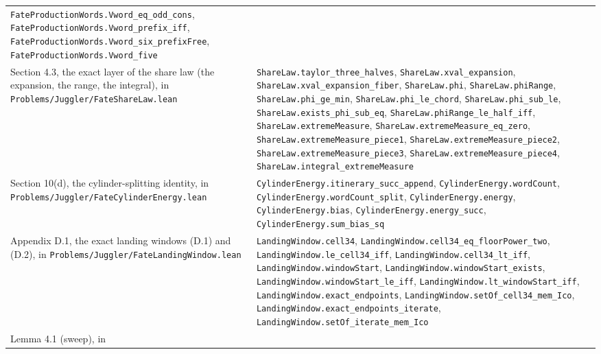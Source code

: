 \documentclass[11pt,a4paper]{article}
\begin{document}
\begin{longtable}[]{@{}
  >{\raggedright\arraybackslash}p{}
  >{\raggedright\arraybackslash}p{}@{}}
\texttt{\nolinkurl{FateProductionWords.Vword_eq_odd_cons}},
\texttt{\nolinkurl{FateProductionWords.Vword_prefix_iff}},
\texttt{\nolinkurl{FateProductionWords.Vword_six_prefixFree}},
\texttt{\nolinkurl{FateProductionWords.Vword_five}} \\
Section 4.3, the exact layer of the share law (the expansion, the range,
the integral), in
\texttt{\nolinkurl{Problems/Juggler/FateShareLaw.lean}} &
\texttt{\nolinkurl{ShareLaw.taylor_three_halves}},
\texttt{\nolinkurl{ShareLaw.xval_expansion}},
\texttt{\nolinkurl{ShareLaw.xval_expansion_fiber}},
\texttt{\nolinkurl{ShareLaw.phi}},
\texttt{\nolinkurl{ShareLaw.phiRange}},
\texttt{\nolinkurl{ShareLaw.phi_ge_min}},
\texttt{\nolinkurl{ShareLaw.phi_le_chord}},
\texttt{\nolinkurl{ShareLaw.phi_sub_le}},
\texttt{\nolinkurl{ShareLaw.exists_phi_sub_eq}},
\texttt{\nolinkurl{ShareLaw.phiRange_le_half_iff}},
\texttt{\nolinkurl{ShareLaw.extremeMeasure}},
\texttt{\nolinkurl{ShareLaw.extremeMeasure_eq_zero}},
\texttt{\nolinkurl{ShareLaw.extremeMeasure_piece1}},
\texttt{\nolinkurl{ShareLaw.extremeMeasure_piece2}},
\texttt{\nolinkurl{ShareLaw.extremeMeasure_piece3}},
\texttt{\nolinkurl{ShareLaw.extremeMeasure_piece4}},
\texttt{\nolinkurl{ShareLaw.integral_extremeMeasure}} \\
Section 10(d), the cylinder-splitting identity, in
\texttt{\nolinkurl{Problems/Juggler/FateCylinderEnergy.lean}} &
\texttt{\nolinkurl{CylinderEnergy.itinerary_succ_append}},
\texttt{\nolinkurl{CylinderEnergy.wordCount}},
\texttt{\nolinkurl{CylinderEnergy.wordCount_split}},
\texttt{\nolinkurl{CylinderEnergy.energy}},
\texttt{\nolinkurl{CylinderEnergy.bias}},
\texttt{\nolinkurl{CylinderEnergy.energy_succ}},
\texttt{\nolinkurl{CylinderEnergy.sum_bias_sq}} \\
Appendix D.1, the exact landing windows (D.1) and (D.2), in
\texttt{\nolinkurl{Problems/Juggler/FateLandingWindow.lean}} &
\texttt{\nolinkurl{LandingWindow.cell34}},
\texttt{\nolinkurl{LandingWindow.cell34_eq_floorPower_two}},
\texttt{\nolinkurl{LandingWindow.le_cell34_iff}},
\texttt{\nolinkurl{LandingWindow.cell34_lt_iff}},
\texttt{\nolinkurl{LandingWindow.windowStart}},
\texttt{\nolinkurl{LandingWindow.windowStart_exists}},
\texttt{\nolinkurl{LandingWindow.windowStart_le_iff}},
\texttt{\nolinkurl{LandingWindow.lt_windowStart_iff}},
\texttt{\nolinkurl{LandingWindow.exact_endpoints}},
\texttt{\nolinkurl{LandingWindow.setOf_cell34_mem_Ico}},
\texttt{\nolinkurl{LandingWindow.exact_endpoints_iterate}},
\texttt{\nolinkurl{LandingWindow.setOf_iterate_mem_Ico}} \\
Lemma 4.1 (sweep), in

\end{longtable}
\end{document}

